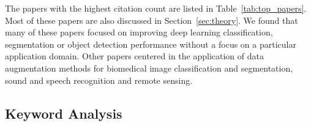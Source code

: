 \documentclass[parskip=full]{scrartcl}
\begin{document}
\begin{table}[H]
    \centering
    \vspace{.2cm}
    \caption{\label{tab:top_conferences}
        Top conferences focusing on data augmentation techniques, sorted by
        citations per document.
    }
\end{table}

The papers with the highest citation count are listed in
Table~\ref{tab:top_papers}. Most of these papers are also discussed in
Section~\ref{sec:theory}. We found that many of these papers focused on
improving deep learning classification, segmentation or object detection
performance without a focus on a particular application domain. Other papers
centered in the application of data augmentation methods for biomedical image
classification and segmentation, sound and speech recognition and remote
sensing. 

\begin{table}[H]
    \centering
    \vspace{.2cm}
    \caption{\label{tab:top_papers}
        Top papers using data augmentation techniques, sorted by citation
        count.
    }
\end{table}


\subsection{Keyword Analysis}
\end{document}
